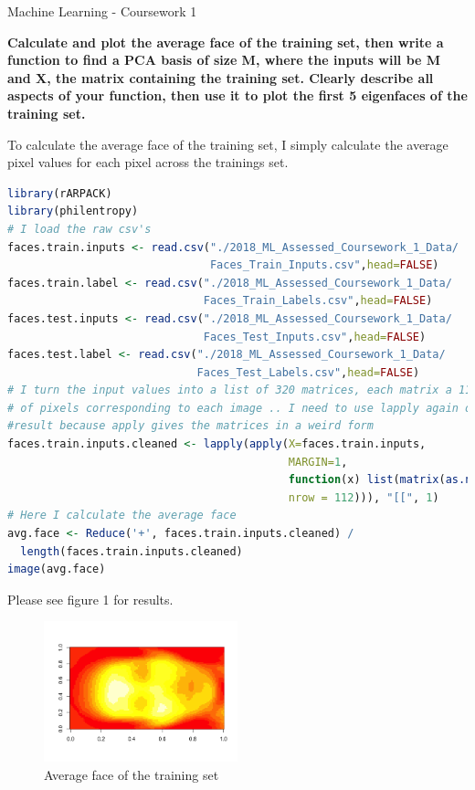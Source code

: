 \documentclass[12pt]{article}
\begin{document}
\pagestyle{fancyplain}
\cfoot{}{}
\begin{center} \Large
Machine Learning - Coursework 1 \\[4mm]
\end{center}
\textbf{Calculate and plot the average face of the training set, then write a function to find a PCA basis of size M, where the inputs will be M and X, the matrix containing the training set. Clearly describe all aspects of your function, then use it to plot the first 5 eigenfaces of the training set.}


To calculate the average face of the training set, I simply calculate the average pixel values for each pixel across the trainings set.
\begin{lstlisting}[linewidth=18.4cm,language=R]
library(rARPACK)
library(philentropy)
# I load the raw csv's
faces.train.inputs <- read.csv("./2018_ML_Assessed_Coursework_1_Data/
                               Faces_Train_Inputs.csv",head=FALSE)
faces.train.label <- read.csv("./2018_ML_Assessed_Coursework_1_Data/
                              Faces_Train_Labels.csv",head=FALSE)
faces.test.inputs <- read.csv("./2018_ML_Assessed_Coursework_1_Data/
                              Faces_Test_Inputs.csv",head=FALSE)
faces.test.label <- read.csv("./2018_ML_Assessed_Coursework_1_Data/
                             Faces_Test_Labels.csv",head=FALSE)
# I turn the input values into a list of 320 matrices, each matrix a 112 x 92 value 
# of pixels corresponding to each image .. I need to use lapply again on the 
#result because apply gives the matrices in a weird form
faces.train.inputs.cleaned <- lapply(apply(X=faces.train.inputs, 
                                           MARGIN=1, 
                                           function(x) list(matrix(as.numeric(x), 
                                           nrow = 112))), "[[", 1)
# Here I calculate the average face
avg.face <- Reduce('+', faces.train.inputs.cleaned) / 
  length(faces.train.inputs.cleaned)
image(avg.face)
\end{lstlisting}
Please see figure 1 for results. \\

\begin{figure}[b]
\caption{Average face of the training set}
\centering
\includegraphics[width=0.5\textwidth]{average}
\end{figure}
\end{document}
